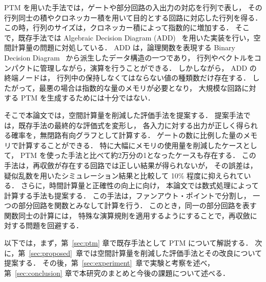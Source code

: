 PTM を用いた手法では，ゲートや部分回路の入出力の対応を行列で表し，
その行列同士の積やクロネッカー積を用いて目的とする回路に対応した行列を得る．
この時，行列のサイズは，クロネッカー積によって指数的に増加する．
そこで，既存手法では Algebraic Decision Diagram (ADD)~\cite{580054}
を用いた実装を行い，空間計算量の問題に対処している．
ADD は，論理関数を表現する Binary Decision Diagram~\cite{BLTJ:BLTJ1585} から派生したデータ構造の一つであり，
行列やベクトルをコンパクトに管理しながら，演算を行うことができる．
しかしながら， ADD の終端ノードは，
行列中の保持しなくてはならない値の種類数だけ存在する．
したがって，最悪の場合は指数的な量のメモリが必要となり，
大規模な回路に対する PTM を生成するためには十分ではない．

そこで本論文では，空間計算量を削減した評価手法を提案する．
提案手法では，既存手法の最終的な評価式を変形し，
各入力に対する出力が正しく得られる確率を，無閉路有向グラフとして計算する．
ゲートの数に比例した量のメモリで計算することができる．%
特に大幅にメモリの使用量を削減したケースとして，
PTM を使った手法と比べて約2万分の1となったケースも存在する．
この手法は，再収斂が存在する回路では正しい結果が得られないが，
その誤差は，疑似乱数を用いたシミュレーション結果と比較して 10\% 程度に抑えられている．
さらに，時間計算量と正確性の向上に向け，
本論文では数式処理によって計算する手法も提案する．
この手法は，ファンアウト・ポイントで分割し，
一つの部分回路を関数とみなして計算を行う．
このとき，同一の部分回路を表す関数同士の計算には，
特殊な演算規則を適用するようにすることで，再収斂に対する問題を回避する．

以下では，まず，第~\ref{sec:ptm} 章で既存手法として PTM について解説する．
次に，第~\ref{sec:proposed}~章では空間計算量を削減した評価手法とその改良について提案する．%
その後，第~\ref{sec:experiment}~章で実験と考察を述べ，
第~\ref{sec:conclusion} 章で本研究のまとめと今後の課題について述べる．

